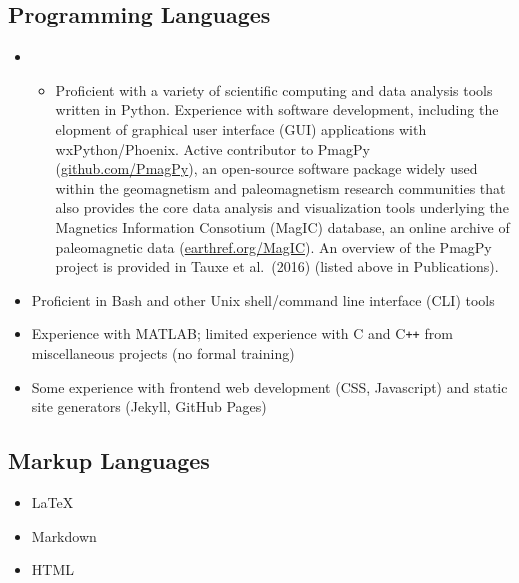 \documentclass[10pt,a4paper,sans]{moderncv}
\begin{document}
\subsection{Programming Languages}
\vspace{5pt}
\begin{itemize}[itemsep=0pt]
 \item {\begin{minipage}[t]{\linewidth}
        \raggedright
       \vspace{-5pt}
       \end{minipage}}
       \raggedright
       \begin{itemize}
        \item[] Proficient with a variety of scientific computing and data analysis tools written in Python. Experience with software development, including the elopment of graphical user interface (GUI) applications with wxPython/Phoenix. Active contributor to PmagPy ({\color{cyan}\href{https://github.com/PmagPy}{github.com/PmagPy}}), an open-source software package widely used within the geomagnetism and paleomagnetism research communities that also provides the core data analysis and visualization tools underlying the Magnetics Information Consotium (MagIC) database, an online archive of paleomagnetic data ({\color{cyan}\href{https://www2.earthref.org/MagIC}{earthref.org/MagIC}}).
              An overview of the PmagPy project is provided in Tauxe et al.\
              (2016) (listed above in Publications).
       \end{itemize}
 \item Proficient in Bash and other Unix shell/command line interface
       (CLI) tools
 \item Experience with MATLAB; limited experience with C and
       C\texttt{++} from miscellaneous projects (no formal training)
 \item Some experience with frontend web development (CSS, Javascript) and
       static site generators (Jekyll, GitHub Pages)
\end{itemize}
\subsection{Markup Languages}
\vspace{-10pt}
\begin{multicols}{3}
 \begin{itemize}%
  \item {\large{}\selectfont\LaTeX}\\
        \raggedright\normalsize
  \item Markdown
  \item HTML
 \end{itemize}
\end{multicols}
\vspace{-15pt}
\end{document}
